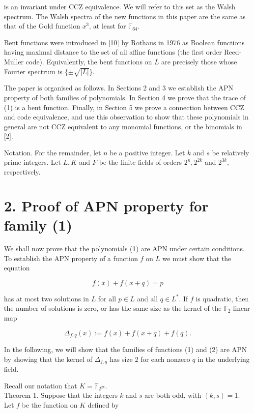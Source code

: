 \documentclass[10pt]{article}
\begin{document}
is an invariant under CCZ equivalence. We will refer to this set as the Walsh spectrum. The Walsh spectra of the new functions in this paper are the same as that of the Gold function $x^{3}$, at least for $\mathbb{F}_{64}$.

Bent functions were introduced in [10] by Rothaus in 1976 as Boolean functions having maximal distance to the set of all affine functions (the first order Reed-Muller code). Equivalently, the bent functions on $L$ are precisely those whose Fourier spectrum is $\{ \pm \sqrt{|L|}\}$.

The paper is organised as follows. In Sections 2 and 3 we establish the APN property of both families of polynomials. In Section 4 we prove that the trace of (1) is a bent function. Finally, in Section 5 we prove a connection between CCZ and code equivalence, and use this observation to show that these polynomials in general are not CCZ equivalent to any monomial functions, or the binomials in [2].

Notation. For the remainder, let $n$ be a positive integer. Let $k$ and $s$ be relatively prime integers. Let $L, K$ and $F$ be the finite fields of orders $2^{n}, 2^{2 k}$ and $2^{3 k}$, respectively.

\section*{2. Proof of APN property for family (1)}
We shall now prove that the polynomials (1) are APN under certain conditions. To establish the APN property of a function $f$ on $L$ we must show that the equation


\begin{equation*}
f(x)+f(x+q)=p \tag{3}
\end{equation*}


has at most two solutions in $L$ for all $p \in L$ and all $q \in L^{*}$. If $f$ is quadratic, then the number of solutions is zero, or has the same size as the kernel of the $\mathbb{F}_{2}$-linear map

$$
\Delta_{f, q}(x):=f(x)+f(x+q)+f(q) .
$$

In the following, we will show that the families of functions (1) and (2) are APN by showing that the kernel of $\Delta_{f, q}$ has size 2 for each nonzero $q$ in the underlying field.

Recall our notation that $K=\mathbb{F}_{2^{2 k}}$.\\
Theorem 1. Suppose that the integers $k$ and $s$ are both odd, with $(k, s)=1$. Let $f$ be the function on $K$ defined by
\end{document}
